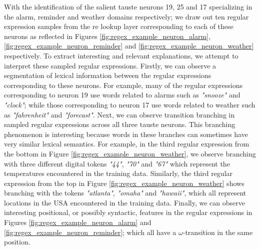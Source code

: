 With the identification of the salient \ac{tauste} neurons 19, 25 and 17 specializing
in the alarm, reminder and weather domains respectively; we draw out ten regular
expression samples from the \ac{re} lookup layer corresponding to each of these neurons
as reflected in Figures \ref{fig:regex_example_neuron_alarm},
\ref{fig:regex_example_neuron_reminder} and
\ref{fig:regex_example_neuron_weather} respectively. To extract interesting and
relevant explanations, we attempt to interpret these sampled regular
expressions. Firstly, we can observe a segmentation of lexical information
between the regular expressions corresponding to these neurons. For example,
many of the regular expressions corresponding to neuron 19 use words related to
alarms such as \textit{"snooze"} and \textit{"clock"}; while those corresponding to neuron 17 use
words related to weather such as \textit{"fahrenheit"} and \textit{"forecast"}. Next, we can
observe transition branching in sampled regular expressions across
all three \ac{tauste} neurons. This branching phenomenon is interesting because words
in these branches can sometimes have very similar lexical semantics. For
example, in the third regular expression from the bottom in Figure
\ref{fig:regex_example_neuron_weather}, we observe branching with three
different digital tokens \textit{"44"}, \textit{"70"} and \textit{"67"} which
represent the temperatures encountered in the training data. Similarly, the
third regular expression from the top in Figure
\ref{fig:regex_example_neuron_weather} shows branching with the tokens
\textit{"atlanta"}, \textit{"omaha"} and \textit{"hawaii"}, which all represent
locations in the USA encountered in the training data. Finally, we can observe
interesting positional, or possibly syntactic, features in the regular
expressions in Figures \ref{fig:regex_example_neuron_alarm} and
\ref{fig:regex_example_neuron_reminder}; which all have a $\omega$-transition in
the same position.

